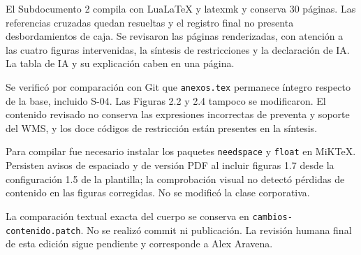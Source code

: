 El Subdocumento 2 compila con LuaLaTeX y latexmk y conserva 30 páginas. Las referencias cruzadas quedan resueltas y el registro final no presenta desbordamientos de caja. Se revisaron las páginas renderizadas, con atención a las cuatro figuras intervenidas, la síntesis de restricciones y la declaración de IA. La tabla de IA y su explicación caben en una página.

Se verificó por comparación con Git que \texttt{anexos.tex} permanece íntegro respecto de la base, incluido S-04. Las Figuras 2.2 y 2.4 tampoco se modificaron. El contenido revisado no conserva las expresiones incorrectas de preventa y soporte del WMS, y los doce códigos de restricción están presentes en la síntesis.

Para compilar fue necesario instalar los paquetes \texttt{needspace} y \texttt{float} en MiKTeX. Persisten avisos de espaciado y de versión PDF al incluir figuras 1.7 desde la configuración 1.5 de la plantilla; la comprobación visual no detectó pérdidas de contenido en las figuras corregidas. No se modificó la clase corporativa.

La comparación textual exacta del cuerpo se conserva en \texttt{cambios-contenido.patch}. No se realizó commit ni publicación. La revisión humana final de esta edición sigue pendiente y corresponde a Alex Aravena.
